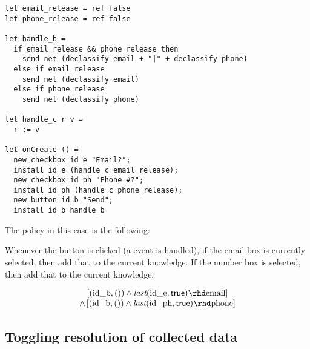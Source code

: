\documentclass[conference]{IEEEtran}
\newcommand{\code}[1]{\text{\lstinline!#1!}}
\theoremstyle{definition}
\newcommand{\sfmt}[1]{\textsf{#1}}
\newcommand{\strue}{\sfmt{true}}
\newcommand{\tlast}[2]{\textit{last}(#1, #2)}
\newcommand{\trelease}{\rhd}
\begin{document}
\begin{lstlisting}
let email_release = ref false
let phone_release = ref false

let handle_b =
  if email_release && phone_release then
    send net (declassify email + "|" + declassify phone)
  else if email_release
    send net (declassify email)
  else if phone_release
    send net (declassify phone)

let handle_c r v =
  r := v
    
let onCreate () = 
  new_checkbox id_e "Email?";
  install id_e (handle_c email_release);
  new_checkbox id_ph "Phone #?";
  install id_ph (handle_c phone_release);
  new_button id_b "Send";
  install id_b handle_b
\end{lstlisting}

The policy in this case is the following:

Whenever the button is clicked (a \code{send} event is handled), if
the email box is currently selected, then add that to the current
knowledge.  If the number box is selected, then add that to the
current knowledge.

\begin{displaymath}
  \begin{array}{c}
    \left[(\code{id_b}, ()) \wedge \tlast{\code{id_e}}{\strue}
    \trelease \code{email}\right] \\
    \wedge 
    \left[(\code{id_b}, ()) \wedge \tlast{\code{id_ph}}{\strue}
    \trelease \code{phone}\right] \\
  \end{array}
\end{displaymath}  



\subsection{Toggling resolution of collected data}
\end{document}
